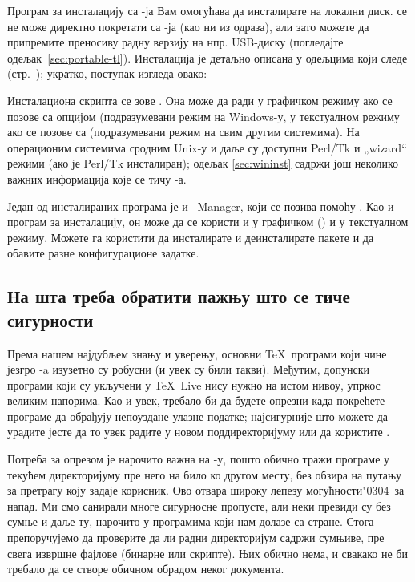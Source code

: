 \documentclass{article}
\begin{document}
Програм за инсталацију са \DVD{}-ја Вам омогућава да инсталирате
\TL{} на локални диск. \TL{} се не може директно покретати са
\DVD{}-ја (као ни из \DVD{}  одраза), али зато можете да
припремите преносиву радну верзију на нпр. USB-диску
(погледајте одељак~\ref{sec:portable-tl}). Инсталација је детаљно
описана у одељцима који следе (стр.~\pageref{sec:install}); укратко,
поступак изгледа овако:

\begin{itemize*}

\item Инсталациона скрипта се зове . Она може да
  ради у графичком режиму ако се позове са опцијом  
  (подразумевани режим на   Win\-\hbox{dows-у}, 
  у текстуалном режиму ако се позове са  
  (подразумевани режим на свим другим системима). На операционим 
  системима сродним Unix-у и даље су доступни Perl/Tk и „wizard“ 
  режими (ако је Perl/Tk инсталиран); одељак \ref{sec:wininst} 
  садржи још неколико важних информација које се
  тичу \Windows{}-а.

\item Један од инсталираних програма је и \TL\ Manager, који се позива
  помоћу . Као и програм за инсталацију, он може да се
  користи и у графичком (\GUI{}) и у текстуалном режиму. Можете га
  користити да инсталирате и деинсталирате пакете и да обавите разне
  конфигурационе задатке.

\end{itemize*}


\subsection{На шта треба обратити пажњу што се тиче сигурности}
\label{sec:security}

Према нашем најдубљем знању и уверењу, основни \TeX\ програми који
чине језгро \TL{}-a изузетно су робусни (и увек су били такви).
Међутим, допунски програми који су укључени у \TeX\ Live нису нужно
на истом нивоу, упркос великим напорима. Као и увек, требало би да
будете опрезни када покрећете програме да обрађују непоуздане улазне
податке; најсигурније што можете да урадите јесте да то увек радите у
новом поддиректоријуму или да користите .

Потреба за опрезом је нарочито важна на \Windows{}-у, пошто
\Windows{} обично тражи програме у текућем директоријуму пре него на
било ко другом месту, без обзира на путању за претрагу коју задаје
корисник. Ово отвара широку лепезу могућности\char"0304\ за напад. Ми
смо санирали многе сигурносне пропусте, али неки превиди су без сумње
и даље ту, нарочито у програмима који нам долазе са стране. Стога
препоручујемо да проверите да ли радни директоријум садржи сумњиве,
пре свега извршне фајлове (бинарне или скрипте). Њих обично нема, и
свакако не би требало да се створе обичном обрадом неког документа.
\end{document}
